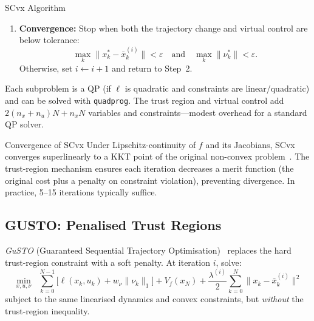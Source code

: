 \begin{defnbox}{SCvx Algorithm}
\begin{enumerate}[nosep]
		\begin{itemize}[nosep]
			\item $\rho \approx 1$: the linear model was accurate $\;\Rightarrow\;$ increase $\Delta$ (e.g., $\Delta \leftarrow 2\Delta$) to allow larger steps.
			\item $0 < \rho \ll 1$: the model over-predicted the improvement $\;\Rightarrow\;$ keep $\Delta$ or decrease it.
			\item $\rho \le 0$: the actual cost \emph{increased} despite the model predicting a decrease $\;\Rightarrow\;$ reject the step (keep $\bar{x}^{(i)}, \bar{u}^{(i)}$) and shrink $\Delta$ (e.g., $\Delta \leftarrow \Delta/2$).
		\end{itemize}
		If the step is accepted, set $(\bar{x}^{(i+1)}, \bar{u}^{(i+1)}) \leftarrow (x^*, u^*)$. Otherwise, keep the previous iterate and re-solve with the smaller trust region.
		\item \textbf{Convergence:} Stop when both the trajectory change and virtual control are below tolerance:
		\[
			\max_k\|x_k^* - \bar{x}_k^{(i)}\| < \varepsilon \quad\text{and}\quad \max_k\|\nu_k^*\| < \varepsilon.
		\]
		Otherwise, set $i \leftarrow i + 1$ and return to Step~2.
	\end{enumerate}
\end{defnbox}

Each subproblem is a QP (if $\ell$ is quadratic and constraints are linear/quadratic) and can be solved with \texttt{quadprog}. The trust region and virtual control add $2(n_x + n_u)N + n_x N$ variables and constraints---modest overhead for a standard QP solver.

\begin{alertbox}{Convergence of SCvx}
	Under Lipschitz-continuity of $f$ and its Jacobians, SCvx converges superlinearly to a KKT point of the original non-convex problem~\cite{Mao2020}. The trust-region mechanism ensures each iteration decreases a merit function (the original cost plus a penalty on constraint violation), preventing divergence. In practice, 5--15 iterations typically suffice.
\end{alertbox}

\subsection{GUSTO: Penalised Trust Regions}
\label{sec:gusto}

\emph{GuSTO} (Guaranteed Sequential Trajectory Optimisation)~\cite{Bonalli2019} replaces the hard trust-region constraint with a soft penalty. At iteration $i$, solve:
\[
\min_{x, u, \nu} \;\; \sum_{k=0}^{N-1}\bigl[\ell(x_k, u_k) + w_\nu \|\nu_k\|_1\bigr] + V_f(x_N) + \frac{\lambda^{(i)}}{2}\sum_{k=0}^{N}\|x_k - \bar{x}_k^{(i)}\|^2
\]
subject to the same linearised dynamics and convex constraints, but \emph{without} the trust-region inequality.

